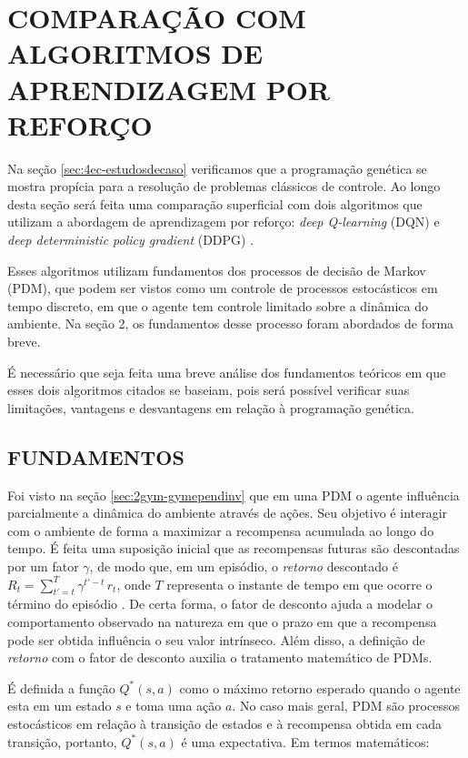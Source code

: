 \section{COMPARAÇÃO COM ALGORITMOS DE APRENDIZAGEM POR REFORÇO}\label{sec:5comp-comparacao}

Na seção \ref{sec:4ec-estudosdecaso} verificamos que a programação genética se mostra propícia para a resolução de problemas clássicos de controle. Ao longo desta seção será feita uma comparação superficial com dois algoritmos que utilizam a abordagem de aprendizagem por reforço: \textit{deep Q-learning} (DQN) \cite{silver2013dqn} e \textit{deep deterministic policy gradient} (DDPG) \cite{lili2015ddpg}. 

Esses algoritmos utilizam fundamentos dos processos de decisão de Markov (PDM), que podem ser vistos como um controle de processos estocásticos em tempo discreto, em que o agente tem controle limitado sobre a dinâmica do ambiente. Na seção 2, os fundamentos desse processo foram abordados de forma breve.

É necessário que seja feita uma breve análise dos fundamentos teóricos em que esses dois algoritmos citados se baseiam, pois será possível verificar suas limitações, vantagens e desvantagens em relação à programação genética.

\subsection{FUNDAMENTOS}\label{ssec:5comp-fundamentos}

Foi visto na seção \ref{sec:2gym-gymependinv} que em uma PDM o agente influência parcialmente a dinâmica do ambiente através de ações. Seu objetivo é interagir com o ambiente de forma a maximizar a recompensa acumulada ao longo do tempo. É feita uma suposição inicial que as recompensas futuras são descontadas por um fator $\gamma$, de modo que, em um episódio, o \textit{retorno} descontado é $R_t=\sum_{t'=t}^T \gamma^{t'-t}\,r_t$, onde $T$ representa o instante de tempo em que ocorre o término do episódio \cite{silver2013dqn}. De certa forma, o fator de desconto ajuda a modelar o comportamento observado na natureza em que o prazo em que a recompensa pode ser obtida influência o seu valor intrínseco. Além disso, a definição de \textit{retorno} com o fator de desconto auxilia o tratamento matemático de PDMs.

É definida a função $Q^*(s,a)$ como o máximo retorno esperado quando o agente esta em um estado $s$ e toma uma ação $a$. No caso mais geral, PDM são processos estocásticos em relação à transição de estados e à recompensa obtida em cada transição, portanto, $Q^*(s,a)$ é uma expectativa. Em termos matemáticos:

